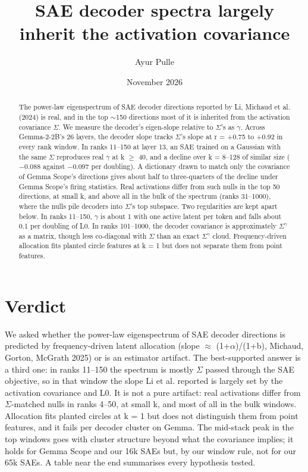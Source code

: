 \documentclass[11pt]{article}
\title{SAE decoder spectra largely inherit the activation covariance}
\author{Ayur Pulle}
\date{November 2026}
\begin{document}
\maketitle

\begin{abstract}
The power-law eigenspectrum of SAE decoder directions reported by Li, Michaud et al. (2024) is real, and in the top $\sim$150 directions most of it is inherited from the activation covariance $\Sigma$. We measure the decoder's eigen-slope relative to $\Sigma$'s as $\gamma$. Across Gemma-2-2B's 26 layers, the decoder slope tracks $\Sigma$'s slope at r = +0.75 to +0.92 in every rank window. In ranks 11--150 at layer 13, an SAE trained on a Gaussian with the same $\Sigma$ reproduces real $\gamma$ at k $\ge$ 40, and a decline over k = 8--128 of similar size ($-$0.088 against $-$0.097 per doubling). A dictionary drawn to match only the covariance of Gemma Scope's directions gives about half to three-quarters of the decline under Gemma Scope's firing statistics. Real activations differ from such nulls in the top 50 directions, at small k, and above all in the bulk of the spectrum (ranks 31--1000), where the nulls pile decoders into $\Sigma$'s top subspace. Two regularities are kept apart below. In ranks 11--150, $\gamma$ is about 1 with one active latent per token and falls about 0.1 per doubling of L0. In ranks 101--1000, the decoder covariance is approximately $\Sigma^{\gamma}$ as a matrix, though less co-diagonal with $\Sigma$ than an exact $\Sigma^{\gamma}$ cloud. Frequency-driven allocation fits planted circle features at k = 1 but does not separate them from point features.
\end{abstract}

\section{Verdict}

We asked whether the power-law eigenspectrum of SAE decoder directions is predicted by frequency-driven latent allocation (slope $\approx$ (1+$\alpha$)/(1+b), Michaud, Gorton, McGrath 2025) or is an estimator artifact. The best-supported answer is a third one: in ranks 11--150 the spectrum is mostly $\Sigma$ passed through the SAE objective, so in that window the slope Li et al. reported is largely set by the activation covariance and L0. It is not a pure artifact: real activations differ from $\Sigma$-matched nulls in ranks 4--50, at small k, and most of all in the bulk windows. Allocation fits planted circles at k = 1 but does not distinguish them from point features, and it fails per decoder cluster on Gemma. The mid-stack peak in the top windows goes with cluster structure beyond what the covariance implies; it holds for Gemma Scope and our 16k SAEs but, by our window rule, not for our 65k SAEs. A table near the end summarises every hypothesis tested.
\end{document}
